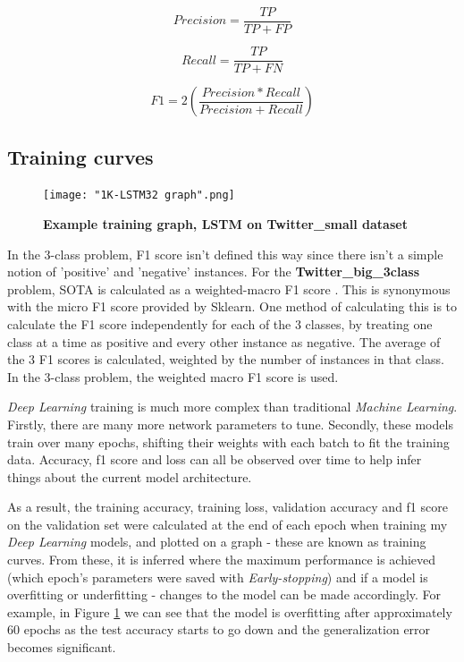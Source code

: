 \documentclass[12pt,a4paper]{article}
\begin{document}
\begin{multicols}{2}
	\begin{equation}
	{Precision = \frac{TP}{TP+FP} }
	\end{equation}
	
	\begin{equation}
	{Recall = \frac{TP}{TP+FN} }
	\end{equation}
	
	\begin{equation}
	{F1 = 2 ( \frac{Precision*Recall}{Precision+Recall} )}
	\end{equation}
\end{multicols}

\subsection{Training curves}
\begin{figure}
	\centering
	\texttt{[image: "1K-LSTM32 graph".png]}
	\caption{\textbf{Example training graph, LSTM on \textbf{Twitter\_small} dataset}}
	\label{training}
\end{figure}

In the 3-class problem, F1 score isn't defined this way since there isn't a simple notion of 'positive' and 'negative' instances. For the \textbf{Twitter\_big\_3class} problem, SOTA is calculated as a weighted-macro F1 score \cite{Badjatiya}. This is synonymous with the micro F1 score provided by Sklearn. One method of calculating this is to calculate the F1 score independently for each of the 3 classes, by treating one class at a time as positive and every other instance as negative. The average of the 3 F1 scores is calculated, weighted by the number of instances in that class. In the 3-class problem, the weighted macro F1 score is used.

\textit{Deep Learning} training is much more complex than traditional \textit{Machine Learning}. Firstly, there are many more network parameters to tune. Secondly, these models train over many epochs, shifting their weights with each batch to fit the training data. Accuracy, f1 score and loss can all be observed over time to help infer things about the current model architecture.

As a result, the training accuracy, training loss, validation accuracy  and f1 score on the validation set were calculated at the end of each epoch when training my \textit{Deep Learning} models, and plotted on a graph - these are known as training curves. From these, it is inferred where the maximum performance is achieved (which epoch's parameters were saved with \textit{Early-stopping}) and if a model is overfitting or underfitting - changes to the model can be made accordingly. For example, in Figure \ref{training} we can see that the model is overfitting after approximately 60 epochs as the test accuracy starts to go down and the generalization error becomes significant.
\end{document}
